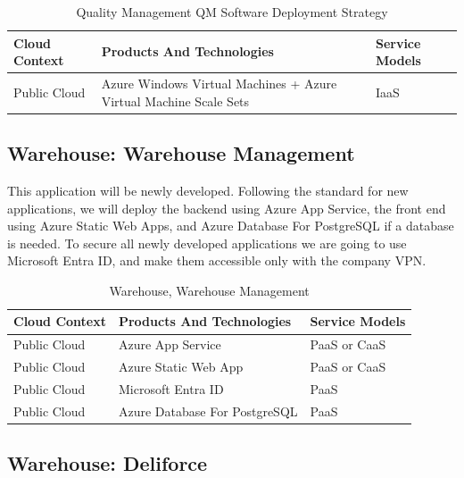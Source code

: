 \documentclass{llncs}
\begin{document}
\begin{table}[h!]
    \centering
    \begin{tabular}{lll}
        \hline
        \textbf{Cloud Context} & \textbf{Products And Technologies}                                & \textbf{Service Models} \\
        \hline
 Public Cloud           & Azure Windows Virtual Machines + Azure Virtual Machine Scale Sets & IaaS                    \\
    \end{tabular}
    \caption{Quality Management QM Software Deployment Strategy}
\end{table}

\subsection{Warehouse: Warehouse Management}
This application will be newly developed. Following the standard for new applications, we will deploy the backend using Azure App Service, the front end using Azure Static Web Apps, and Azure Database For PostgreSQL if a database is needed.
To secure all newly developed applications we are going to use Microsoft Entra ID, and make them accessible only with the company VPN.\\

\begin{table}[h!]
    \centering
    \begin{tabular}{lll}
        \hline
        \textbf{Cloud Context} & \textbf{Products And Technologies} & \textbf{Service Models} \\
        \hline
 Public Cloud           & Azure App Service                  & PaaS or CaaS            \\
        \hline
 Public Cloud           & Azure Static Web App               & PaaS or CaaS            \\

        \hline
 Public Cloud           & Microsoft Entra ID                 & PaaS                    \\
        \hline
 Public Cloud           & Azure Database For PostgreSQL      & PaaS                    \\
        \hline
    \end{tabular}
    \caption{Warehouse, Warehouse Management}
\end{table}

\subsection{Warehouse: Deliforce}
\end{document}
